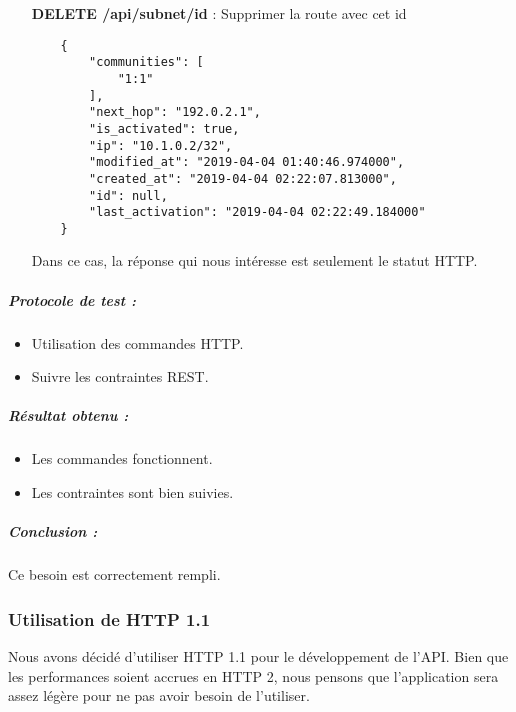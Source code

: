 \begin{itemize}
    \texttt{Requête :}
    \begin{verbatim}
    {
        "is_activated": true
    }
    \end{verbatim}

    \texttt{Réponse :}
    \begin{verbatim}
    # Success:
    {
        "is_activated": true,
        "modified_at": "2019-04-04 14:18:10.679000",
        "ip": "192.168.1.1/24",
        "last_activation": "2019-04-04 14:12:03.846000",
        "created_at": "2019-04-04 14:12:03.846000",
        "communities": [
            "1:1"
        ],
        "next_hop": "6.15.6.56",
        "id": "5ca5f493bac6dd30c8759baa"
    }

    # Failure:
    {
        "message": {
            "is_activated": "The boolean activation"
        }
    }
    \end{verbatim}

    \item [\textbf{DELETE /api/subnet/id}] : Supprimer la route avec cet id
    \begin{verbatim}
    {
        "communities": [
            "1:1"
        ],
        "next_hop": "192.0.2.1",
        "is_activated": true,
        "ip": "10.1.0.2/32",
        "modified_at": "2019-04-04 01:40:46.974000",
        "created_at": "2019-04-04 02:22:07.813000",
        "id": null,
        "last_activation": "2019-04-04 02:22:49.184000"
    }
    \end{verbatim}
    Dans ce cas, la réponse qui nous intéresse est seulement le statut HTTP.
\end{itemize}

\subparagraph{Protocole de test :}
\begin{itemize}
    \item Utilisation des commandes HTTP.
    \item Suivre les contraintes REST.
\end{itemize}
\subparagraph{Résultat obtenu :}
    \begin{itemize}
    \item Les commandes fonctionnent.
    \item Les contraintes sont bien suivies.
\end{itemize}
\subparagraph{Conclusion :}Ce besoin est correctement rempli.

\subsubsection{Utilisation de HTTP 1.1}
Nous avons décidé d'utiliser HTTP 1.1 pour le développement de l'API. Bien que les performances soient accrues en HTTP 2, nous pensons que l'application sera assez légère pour ne pas avoir besoin de l'utiliser.

